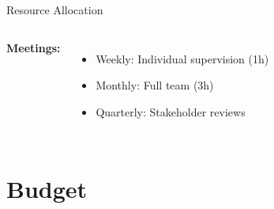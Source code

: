 \documentclass[aspectratio=169]{beamer}
\begin{document}
\begin{frame}{Resource Allocation}
\begin{columns}[t]
\vspace{0.2cm}
\textbf{Meetings:}
\begin{itemize}
    \scriptsize
    \item Weekly: Individual supervision (1h)
    \item Monthly: Full team (3h)
    \item Quarterly: Stakeholder reviews
\end{itemize}
\end{columns}

\end{frame}

\section{Budget}
\end{document}
